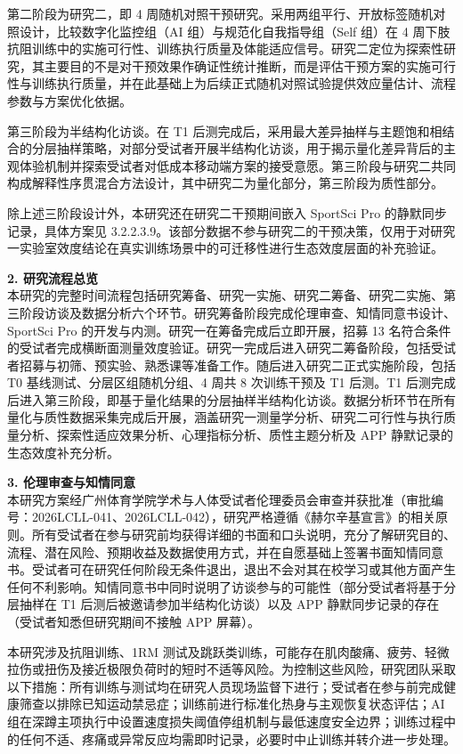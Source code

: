\documentclass[UTF8,zihao=-4,twoside,openany]{ctexbook}
\begin{document}
第二阶段为研究二，即 4 周随机对照干预研究。采用两组平行、开放标签随机对照设计，比较数字化监控组（AI 组）与规范化自我指导组（Self 组）在 4 周下肢抗阻训练中的实施可行性、训练执行质量及体能适应信号。研究二定位为探索性研究，其主要目的不是对干预效果作确证性统计推断，而是评估干预方案的实施可行性与训练执行质量，并在此基础上为后续正式随机对照试验提供效应量估计、流程参数与方案优化依据。

第三阶段为半结构化访谈。在 T1 后测完成后，采用最大差异抽样与主题饱和相结合的分层抽样策略，对部分受试者开展半结构化访谈，用于揭示量化差异背后的主观体验机制并探索受试者对低成本移动端方案的接受意愿。第三阶段与研究二共同构成解释性序贯混合方法设计，其中研究二为量化部分，第三阶段为质性部分。

除上述三阶段设计外，本研究还在研究二干预期间嵌入 SportSci Pro 的静默同步记录，具体方案见 3.2.2.3.9。该部分数据不参与研究二的干预决策，仅用于对研究一实验室效度结论在真实训练场景中的可迁移性进行生态效度层面的补充验证。

\vspace{0.2cm}
\noindent \textbf{2. 研究流程总览} \\
本研究的完整时间流程包括研究筹备、研究一实施、研究二筹备、研究二实施、第三阶段访谈及数据分析六个环节。研究筹备阶段完成伦理审查、知情同意书设计、SportSci Pro 的开发与内测。研究一在筹备完成后立即开展，招募 13 名符合条件的受试者完成横断面测量效度验证。研究一完成后进入研究二筹备阶段，包括受试者招募与初筛、预实验、熟悉课等准备工作。随后进入研究二正式实施阶段，包括 T0 基线测试、分层区组随机分组、4 周共 8 次训练干预及 T1 后测。T1 后测完成后进入第三阶段，即基于量化结果的分层抽样半结构化访谈。数据分析环节在所有量化与质性数据采集完成后开展，涵盖研究一测量学分析、研究二可行性与执行质量分析、探索性适应效果分析、心理指标分析、质性主题分析及 APP 静默记录的生态效度补充分析。

\vspace{0.2cm}
\noindent \textbf{3. 伦理审查与知情同意} \\
本研究方案经广州体育学院学术与人体受试者伦理委员会审查并获批准（审批编号：2026LCLL-041、2026LCLL-042），研究严格遵循《赫尔辛基宣言》的相关原则。所有受试者在参与研究前均获得详细的书面和口头说明，充分了解研究目的、流程、潜在风险、预期收益及数据使用方式，并在自愿基础上签署书面知情同意书。受试者可在研究任何阶段无条件退出，退出不会对其在校学习或其他方面产生任何不利影响。知情同意书中同时说明了访谈参与的可能性（部分受试者将基于分层抽样在 T1 后测后被邀请参加半结构化访谈）以及 APP 静默同步记录的存在（受试者知悉但研究期间不接触 APP 屏幕）。

本研究涉及抗阻训练、1RM 测试及跳跃类训练，可能存在肌肉酸痛、疲劳、轻微拉伤或扭伤及接近极限负荷时的短时不适等风险。为控制这些风险，研究团队采取以下措施：所有训练与测试均在研究人员现场监督下进行；受试者在参与前完成健康筛查以排除已知运动禁忌症；训练前进行标准化热身与主观恢复状态评估；AI 组在深蹲主项执行中设置速度损失阈值停组机制与最低速度安全边界；训练过程中的任何不适、疼痛或异常反应均需即时记录，必要时中止训练并转介进一步处理。
\end{document}
